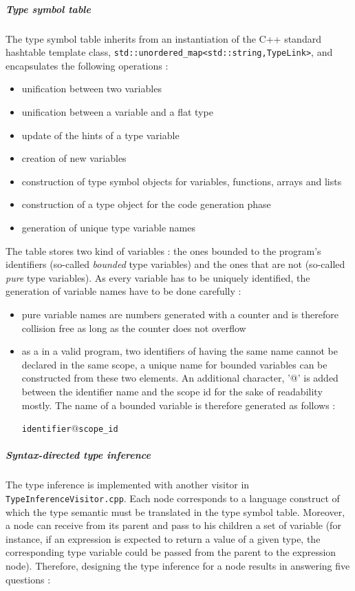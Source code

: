 \documentclass[a4paper,11pt]{article}
\begin{document}
\subparagraph{Type symbol table} The type symbol table inherits from an instantiation of the C++ standard hashtable template class, \texttt{std::unordered\_map<std::string,TypeLink>}, and encapsulates the following operations :
\begin{itemize}
	\item unification between two variables
	\item unification between a variable and a flat type
	\item update of the hints of a type variable
	\item creation of new variables
	\item construction of type symbol objects for variables, functions, arrays and lists
	\item construction of a type object for the code generation phase
	\item generation of unique type variable names 
\end{itemize} 
The table stores two kind of variables : the ones bounded to the program's identifiers (so-called \textit{bounded} type variables) and the ones that are not (so-called \textit{pure} type variables). As every variable has to be uniquely identified, the generation of variable names have to be done carefully :
\begin{itemize}
	\item pure variable names are numbers generated with a counter and is therefore collision free as long as the counter does not overflow
	\item as a in a valid program, two identifiers of having the same name cannot be declared in the same scope, a unique name for bounded variables can be constructed from these two elements. An additional character, '@' is added between the identifier name and the scope id for the sake of readability mostly. The name of a bounded variable is therefore generated as follows :
	\begin{center}
		\texttt{identifier}@\texttt{scope\_id}
	\end{center}
\end{itemize}
\subparagraph{Syntax-directed type inference} The type inference is implemented with another visitor in \texttt{TypeInferenceVisitor.cpp}. Each node corresponds to a language construct of which the type semantic must be translated in the type symbol table. Moreover, a node can receive from its parent and pass to his children a set of variable (for instance, if an expression is expected to return a value of a given type, the corresponding type variable could be passed from the parent to the expression node). Therefore, designing the type inference for a node results in answering five questions :
\end{document}
